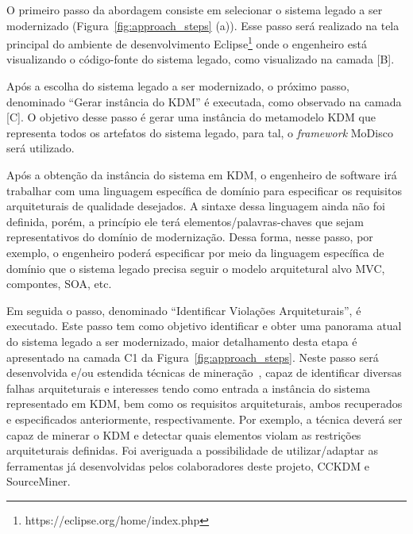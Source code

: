 \documentclass[12pt]{article}
\begin{document}
O primeiro passo da abordagem consiste em selecionar o sistema legado a ser modernizado (Figura~\ref{fig:approach_steps} (a)). Esse passo será realizado na tela principal do ambiente de desenvolvimento Eclipse\footnote{https://eclipse.org/home/index.php} onde o engenheiro está visualizando o código-fonte do sistema legado, como visualizado na camada [B]. 

Após a escolha do sistema legado a ser modernizado, o próximo passo, denominado ``Gerar instância do KDM'' é executada, como observado na camada [C]. O objetivo desse passo é gerar uma instância do metamodelo KDM que representa todos os artefatos do sistema legado, para tal, o \textit{framework} MoDisco será utilizado.

Após a obtenção da instância do sistema em KDM, o engenheiro de software irá trabalhar com uma linguagem específica de domínio para especificar os requisitos arquiteturais de qualidade desejados. A sintaxe dessa linguagem ainda não foi definida, porém, a princípio ele terá elementos/palavras-chaves que sejam representativos do domínio de modernização. Dessa forma, nesse passo, por exemplo, o engenheiro poderá especificar por meio da linguagem específica de domínio que o sistema legado precisa seguir o modelo arquitetural alvo MVC, compontes, SOA, etc.

Em seguida o passo, denominado ``Identificar Violações Arquiteturais'', é executado. Este passo tem como objetivo identificar e obter uma panorama atual do sistema legado a ser modernizado, maior detalhamento desta etapa é apresentado na camada C1 da Figura~\ref{fig:approach_steps}. Neste passo será desenvolvida e/ou estendida técnicas de mineração~\cite{source_miner_glauco, daniel_san_journal}, capaz de identificar diversas falhas arquiteturais e interesses tendo como entrada a instância do sistema representado em KDM, bem como os requisitos arquiteturais, ambos recuperados e especificados anteriormente, respectivamente. Por exemplo, a técnica deverá ser capaz de minerar o KDM e detectar quais elementos violam as restrições arquiteturais definidas. Foi averiguada a possibilidade de utilizar/adaptar as ferramentas já desenvolvidas pelos colaboradores deste projeto, CCKDM e SourceMiner.  
\end{document}
